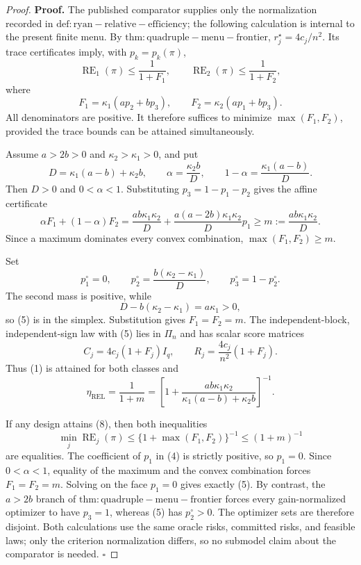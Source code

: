 \documentclass{article}
\begin{document}
\begin{proof}
\textbf{Proof.}
The published comparator supplies only the normalization recorded in \(\mathrm{def:ryan-relative-efficiency}\); the following calculation is internal to the present finite menu.  By \(\mathrm{thm:quadruple-menu-frontier}\), \(r_j^\star=4c_j/n^2\).  Its trace certificates imply, with \(p_k=p_k(\pi)\),
\[
\operatorname{RE}_1(\pi)\le\frac1{1+F_1},
\qquad
\operatorname{RE}_2(\pi)\le\frac1{1+F_2}, \tag{1}
\]
where
\[
F_1=\kappa_1(ap_2+bp_3),
\qquad F_2=\kappa_2(ap_1+bp_3). \tag{2}
\]
All denominators are positive.  It therefore suffices to minimize \(\max(F_1,F_2)\), provided the trace bounds can be attained simultaneously.

Assume \(a>2b>0\) and \(\kappa_2>\kappa_1>0\), and put
\[
D=\kappa_1(a-b)+\kappa_2b,
\qquad
\alpha=\frac{\kappa_2b}{D},
\qquad
1-\alpha=\frac{\kappa_1(a-b)}D. \tag{3}
\]
Then \(D>0\) and \(0<\alpha<1\).  Substituting \(p_3=1-p_1-p_2\) gives the affine certificate
\[
\alpha F_1+(1-\alpha)F_2
=\frac{ab\kappa_1\kappa_2}{D}
+\frac{a(a-2b)\kappa_1\kappa_2}{D}p_1
\ge m:=\frac{ab\kappa_1\kappa_2}{D}. \tag{4}
\]
Since a maximum dominates every convex combination, \(\max(F_1,F_2)\ge m\).

Set
\[
p_1^\circ=0,
\qquad
p_2^\circ=\frac{b(\kappa_2-\kappa_1)}D,
\qquad
p_3^\circ=1-p_2^\circ. \tag{5}
\]
The second mass is positive, while
\[
D-b(\kappa_2-\kappa_1)=a\kappa_1>0, \tag{6}
\]
so (5) is in the simplex.  Substitution gives \(F_1=F_2=m\).  The independent-block, independent-sign law with (5) lies in \(\Pi_n\) and has scalar score matrices
\[
C_j=4c_j(1+F_j)I_q,
\qquad
R_j=\frac{4c_j}{n^2}(1+F_j). \tag{7}
\]
Thus (1) is attained for both classes and
\[
\eta_{\mathrm{REL}}
=\frac1{1+m}
=\left[1+\frac{ab\kappa_1\kappa_2}
{\kappa_1(a-b)+\kappa_2b}\right]^{-1}. \tag{8}
\]

If any design attains (8), then both inequalities
\[
\min_j\operatorname{RE}_j(\pi)
\le\{1+\max(F_1,F_2)\}^{-1}
\le(1+m)^{-1} \tag{9}
\]
are equalities.  The coefficient of \(p_1\) in (4) is strictly positive, so \(p_1=0\).  Since \(0<\alpha<1\), equality of the maximum and the convex combination forces \(F_1=F_2=m\).  Solving on the face \(p_1=0\) gives exactly (5).  By contrast, the \(a>2b\) branch of \(\mathrm{thm:quadruple-menu-frontier}\) forces every gain-normalized optimizer to have \(p_3=1\), whereas (5) has \(p_2^\circ>0\).  The optimizer sets are therefore disjoint.  Both calculations use the same oracle risks, committed risks, and feasible laws; only the criterion normalization differs, so no submodel claim about the comparator is needed. \(\square\)
\end{proof}
\end{document}
